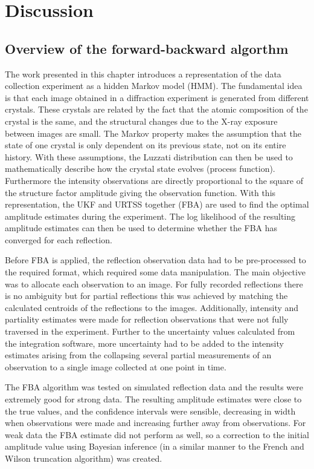 \section{Discussion}
\label{sec:Discussion - Data Reduction}

\subsection{Overview of the forward-backward algorthm}
\label{sub:Overview of the forward-backward algorthm}
The work presented in this chapter introduces a representation of the data collection experiment as a hidden Markov model (HMM).
The fundamental idea is that each image obtained in a diffraction experiment is generated from different crystals.
These crystals are related by the fact that the atomic composition of the crystal is the same, and the structural changes due to the X-ray exposure between images are small.
The Markov property makes the assumption that the state of one crystal is only dependent on its previous state, not on its entire history.
With these assumptions, the Luzzati distribution \cite{luzzati1952traitement,read1990structure} can then be used to mathematically describe how the crystal state evolves (process function).
Furthermore the intensity observations are directly proportional to the square of the structure factor amplitude giving the observation function.
With this representation, the UKF and URTSS together (FBA) are used to find the optimal amplitude estimates during the experiment.
The log likelihood of the resulting amplitude estimates can then be used to determine whether the FBA has converged for each reflection.

Before FBA is applied, the reflection observation data had to be pre-processed to the required format, which required some data manipulation.
The main objective was to allocate each observation to an image.
For fully recorded reflections there is no ambiguity but for partial reflections this was achieved by matching the calculated centroids of the reflections to the images.
Additionally, intensity and partiality estimates were made for reflection observations that were not fully traversed in the experiment.
Further to the uncertainty values calculated from the integration software, more uncertainty had to be added to the intensity estimates arising from the collapsing several partial measurements of an observation to a single image collected at one point in time.

The FBA algorithm was tested on simulated reflection data and the results were extremely good for strong data.
The resulting amplitude estimates were close to the true values, and the confidence intervals were sensible, decreasing in width when observations were made and increasing further away from observations.
For weak data the FBA estimate did not perform as well, so a correction to the initial amplitude value using Bayesian inference (in a similar manner to the French and Wilson truncation algorithm) was created.

